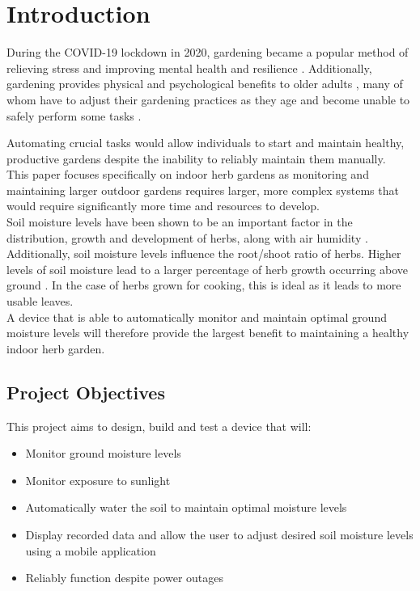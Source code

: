\graphicspath{{introduction/fig/}}

\chapter{Introduction}
\label{chap:introduction}

During the COVID-19 lockdown in 2020, gardening became a popular method of relieving stress \cite{covid_stress_study} and improving mental health and resilience \cite{mental_resiliance_study}. Additionally, gardening provides physical and psychological benefits to older adults \cite{seniors_psych_study}, many of whom have to adjust their gardening practices as they age and become unable to safely perform some tasks \cite{seniors_garden_study}.

Automating crucial tasks would allow individuals to start and maintain healthy, productive gardens despite the inability to reliably maintain them manually.
\\

This paper focuses specifically on indoor herb gardens as monitoring and maintaining larger outdoor gardens requires larger, more complex systems that would require significantly more time and resources to develop.
\\

Soil moisture levels have been shown to be an important factor in the distribution, growth and development of herbs, along with air humidity \cite{humidity_moisture_study}. Additionally, soil moisture levels influence the root/shoot ratio of herbs. Higher levels of soil moisture lead to a larger percentage of herb growth occurring above ground \cite{root_shoot_study}. In the case of herbs grown for cooking, this is ideal as it leads to more usable leaves. 
\\

A device that is able to automatically monitor and maintain optimal ground moisture levels will therefore provide the largest benefit to maintaining a healthy indoor herb garden.

\section{Project Objectives}
This project aims to design, build and test a device that will:
\begin{itemize}
    \item Monitor ground moisture levels
    \item Monitor exposure to sunlight
    \item Automatically water the soil to maintain optimal moisture levels
    \item Display recorded data and allow the user to adjust desired soil moisture levels using a mobile application
    \item Reliably function despite power outages
\end{itemize}

